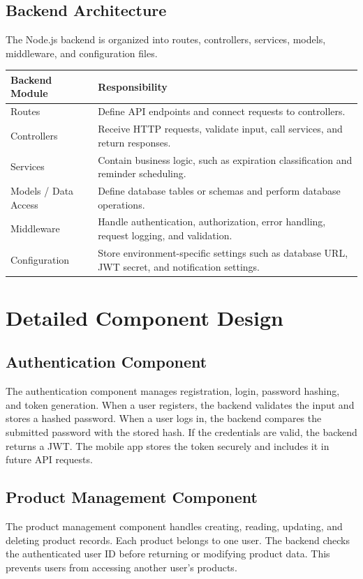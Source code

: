 \documentclass[12pt]{article}
\begin{document}
\subsection{Backend Architecture}
The Node.js backend is organized into routes, controllers, services, models, middleware, and configuration files.

\begin{longtable}{|p{}|p{}|}
\hline
\textbf{Backend Module} & \textbf{Responsibility} \\
\hline
Routes & Define API endpoints and connect requests to controllers. \\
\hline
Controllers & Receive HTTP requests, validate input, call services, and return responses. \\
\hline
Services & Contain business logic, such as expiration classification and reminder scheduling. \\
\hline
Models / Data Access & Define database tables or schemas and perform database operations. \\
\hline
Middleware & Handle authentication, authorization, error handling, request logging, and validation. \\
\hline
Configuration & Store environment-specific settings such as database URL, JWT secret, and notification settings. \\
\hline
\end{longtable}

\section{Detailed Component Design}

\subsection{Authentication Component}
The authentication component manages registration, login, password hashing, and token generation. When a user registers, the backend validates the input and stores a hashed password. When a user logs in, the backend compares the submitted password with the stored hash. If the credentials are valid, the backend returns a JWT. The mobile app stores the token securely and includes it in future API requests.

\subsection{Product Management Component}
The product management component handles creating, reading, updating, and deleting product records. Each product belongs to one user. The backend checks the authenticated user ID before returning or modifying product data. This prevents users from accessing another user's products.
\end{document}

